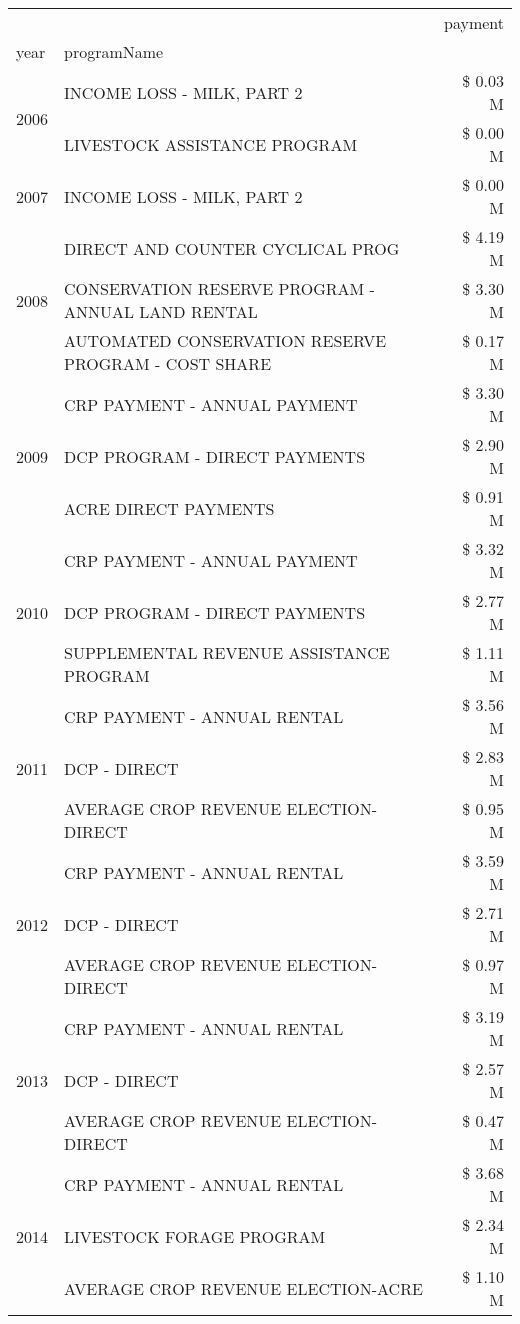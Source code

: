 \begin{tabular}{llr}
\toprule
 &  & payment \\
year & programName &  \\
\midrule
\multirow[t]{2}{*}{2006} & INCOME LOSS - MILK, PART 2 & \$ 0.03 M \\
 & LIVESTOCK ASSISTANCE PROGRAM & \$ 0.00 M \\
\cline{1-3}
2007 & INCOME LOSS - MILK, PART 2 & \$ 0.00 M \\
\cline{1-3}
\multirow[t]{3}{*}{2008} & DIRECT AND COUNTER CYCLICAL PROG & \$ 4.19 M \\
 & CONSERVATION RESERVE PROGRAM - ANNUAL LAND RENTAL & \$ 3.30 M \\
 & AUTOMATED CONSERVATION RESERVE PROGRAM - COST SHARE & \$ 0.17 M \\
\cline{1-3}
\multirow[t]{3}{*}{2009} & CRP PAYMENT - ANNUAL PAYMENT & \$ 3.30 M \\
 & DCP PROGRAM - DIRECT PAYMENTS & \$ 2.90 M \\
 & ACRE DIRECT PAYMENTS & \$ 0.91 M \\
\cline{1-3}
\multirow[t]{3}{*}{2010} & CRP PAYMENT - ANNUAL PAYMENT & \$ 3.32 M \\
 & DCP PROGRAM - DIRECT PAYMENTS & \$ 2.77 M \\
 & SUPPLEMENTAL REVENUE ASSISTANCE PROGRAM & \$ 1.11 M \\
\cline{1-3}
\multirow[t]{3}{*}{2011} & CRP PAYMENT - ANNUAL RENTAL & \$ 3.56 M \\
 & DCP - DIRECT & \$ 2.83 M \\
 & AVERAGE CROP REVENUE ELECTION-DIRECT & \$ 0.95 M \\
\cline{1-3}
\multirow[t]{3}{*}{2012} & CRP PAYMENT - ANNUAL RENTAL & \$ 3.59 M \\
 & DCP - DIRECT & \$ 2.71 M \\
 & AVERAGE CROP REVENUE ELECTION-DIRECT & \$ 0.97 M \\
\cline{1-3}
\multirow[t]{3}{*}{2013} & CRP PAYMENT - ANNUAL RENTAL & \$ 3.19 M \\
 & DCP - DIRECT & \$ 2.57 M \\
 & AVERAGE CROP REVENUE ELECTION-DIRECT & \$ 0.47 M \\
\cline{1-3}
\multirow[t]{3}{*}{2014} & CRP PAYMENT - ANNUAL RENTAL & \$ 3.68 M \\
 & LIVESTOCK FORAGE PROGRAM & \$ 2.34 M \\
 & AVERAGE CROP REVENUE ELECTION-ACRE & \$ 1.10 M \\

\end{tabular}
